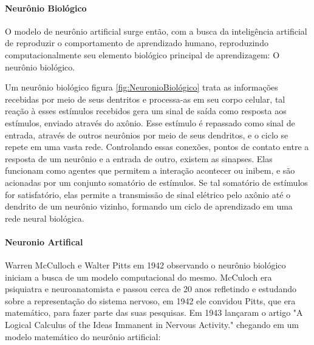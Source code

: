 \documentclass[	12pt, Times, openright, twoside, a4paper, english, brazil]{abntex2}
\begin{document}
          \paragraph*{Neurônio Biológico}
            O modelo de neurônio artificial surge então, com a busca da inteligência artificial de reproduzir o comportamento de aprendizado humano, reproduzindo computacionalmente seu elemento biológico principal de aprendizagem: O neurônio biológico. 
            \begin{figure}[H]
            \end{figure}
            Um neurônio biológico figura \ref{fig:NeuronioBiológico} trata as informações recebidas por meio de seus dentritos e processa-as em seu corpo celular, tal reação à esses estímulos recebidos gera um sinal de saída como resposta aos estímulos, enviado através do axônio. Esse estímulo é repassado como sinal de entrada, através de outros neurônios por meio de seus dendritos, e o ciclo se repete em uma vasta rede.
            Controlando essas conexões, pontos de contato entre a resposta de um neurônio e a entrada de outro, existem as sinapses. Elas funcionam como agentes que permitem a interação acontecer ou inibem, e são acionadas por um conjunto somatório de estímulos. Se tal somatório de estímulos for satisfatório, elas permite a transmissão de sinal elétrico pelo axônio até o dendrito de um neurônio vizinho, formando um ciclo de aprendizado em uma rede neural biológica.

          \paragraph*{Neuronio Artifical}
            Warren McCulloch e Walter Pitts em 1942 observando o neurônio biológico iniciam a busca de um modelo computacional do mesmo. McCuloch era psiquiatra e neuroanatomista e passou cerca de 20 anos refletindo e estudando sobre a representação do sistema nervoso, em 1942 ele convidou Pitts, que era matemático, para fazer parte das suas pesquisas. Em 1943 lançaram o artigo "A Logical Calculus of the Ideas Immanent in Nervous Activity." chegando em um modelo matemático do neurônio artificial: 
\end{document}
